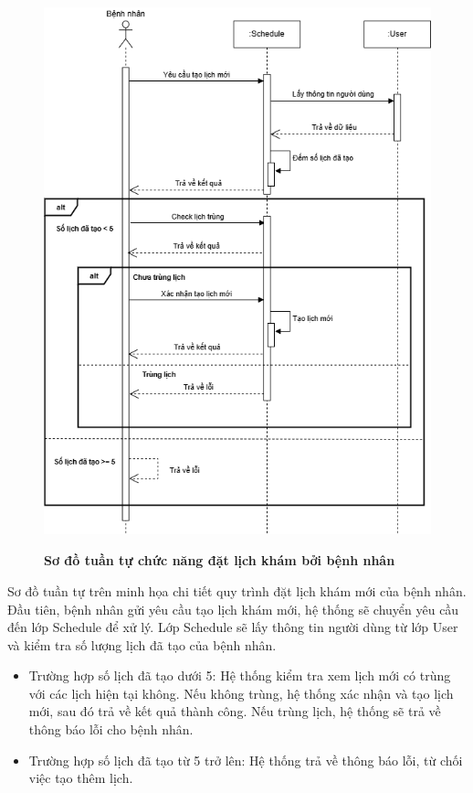 \begin{figure}[H]
	\centering
	\includegraphics[width=12.8cm,height=16cm]{Images/sequence/schedule/createByPatient.drawio.png}
	\caption[Sơ đồ tuần tự chức năng đặt lịch khám bởi bệnh nhân]{\bfseries \fontsize{12pt}{0pt}
		\selectfont Sơ đồ tuần tự chức năng đặt lịch khám bởi bệnh nhân}
	\label{sequence_create_by_patient} %
\end{figure}
Sơ đồ tuần tự trên minh họa chi tiết quy trình đặt lịch khám mới của bệnh nhân. Đầu tiên, bệnh nhân gửi yêu cầu tạo lịch khám mới, hệ thống sẽ chuyển yêu cầu đến lớp Schedule để xử lý.
Lớp Schedule sẽ lấy thông tin người dùng từ lớp User và kiểm tra số lượng lịch đã tạo của bệnh nhân.
\setlength{\itemsep}{0pt}
\setlength{\parskip}{0pt}
\begin{itemize}
	\item Trường hợp số lịch đã tạo dưới 5: Hệ thống kiểm tra xem lịch mới có trùng với các lịch hiện tại không. Nếu không trùng, hệ thống xác nhận và tạo lịch mới, sau đó trả về kết quả thành công. Nếu trùng lịch, hệ thống sẽ trả về thông báo lỗi cho bệnh nhân.
	\item Trường hợp số lịch đã tạo từ 5 trở lên: Hệ thống trả về thông báo lỗi, từ chối việc tạo thêm lịch.
\end{itemize}

